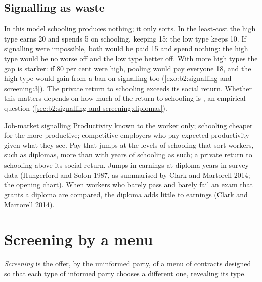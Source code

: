 \subsection{Signalling as waste}

In this model schooling produces nothing; it only sorts. In the least-cost  the high type earns 20
and spends 5 on schooling, keeping 15; the low type keeps 10. If signalling were impossible, both would be paid 15 and spend
nothing: the high type would be no worse off and the low type better off. With more high types the gap is starker: if 80
per cent were high, pooling would pay everyone 18, and the high type would gain from a ban on signalling too
(\cref{exo:b2:signalling-and-screening:3}). The private return to schooling exceeds its social return. Whether this matters
depends on how much of the return to schooling is , an empirical question (\cref{sec:b2:signalling-and-screening:diplomas}).

\begin{model}{Job-market signalling}
\assumes Productivity known to the worker only; schooling cheaper for the more productive; competitive employers who pay
expected productivity given what they see.
\predicts Pay that jumps at the levels of schooling that sort workers, such as diplomas, more than with years of schooling
as such; a private return to schooling above its social return.
\tested Jumps in earnings at diploma years in survey data (Hungerford and Solon 1987, as summarised by Clark and Martorell
2014; the opening chart).
\breaks When workers who barely pass and barely fail an exam that grants a diploma are compared, the diploma adds little
to earnings (Clark and Martorell 2014).
\end{model}

\section{Screening by a menu}\label{sec:b2:signalling-and-screening:screening}

\begin{definition}[Screening]\label{def:b2:signalling-and-screening:screening}
\emph{Screening} is the offer, by the uninformed party, of a menu of contracts designed so that each
type of informed party chooses a different one, revealing its type.
\end{definition}

